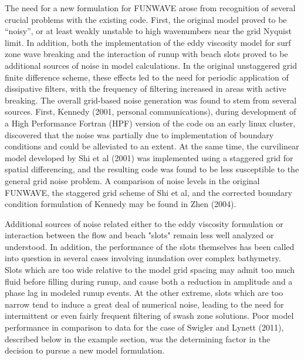 \documentclass[11pt]{article}
\begin{document}
The need for a new formulation for FUNWAVE arose from recognition of several crucial problems with the existing code.  First, the original model proved to be ``noisy'', or at least weakly unstable to high wavenumbers near the grid Nyquist limit.  In addition, both the implementation of the eddy viscosity model for surf zone wave breaking and the interaction of runup with beach slots proved to be additional sources of noise in model calculations.  In the original unstaggered grid finite difference scheme,  these effects led to the need for periodic application of dissipative filters, with the frequency of filtering increased in areas with active breaking.  The overall grid-based noise generation was found to stem from several sources.  First, Kennedy (2001, personal communications), during development of a High Performance Fortran (HPF) version of the code on an early linux cluster, discovered that the noise was partially due to implementation of boundary conditions and could be alleviated to an extent.  At the same time, the curvilinear model developed by Shi et al (2001) was implemented using a staggered grid for spatial differencing, and the resulting code was found to be less susceptible to the general grid noise problem.  A comparison of noise levels in the original FUNWAVE, the staggered grid scheme of Shi et al, and the corrected boundary condition formulation of Kennedy may be found in Zhen (2004).  

Additional sources of noise related either to the eddy viscosity formulation or interaction between the flow and beach "slots" remain less well analyzed or understood.  In addition, the performance of the slots themselves has been called into question in several cases involving inundation over complex bathymetry.   Slots which are too wide relative to the model grid spacing may admit too much fluid before filling during runup, and cause both a reduction in amplitude and a phase lag in modeled runup events. At the other extreme, slots which are too narrow tend to induce a great deal of numerical noise, leading to the need for intermittent or even fairly frequent filtering of swash zone solutions.   Poor model performance in comparison to data for the case of Swigler and Lynett (2011), described below in the example section, was the determining factor in the decision to pursue a new model formulation.
\end{document}

